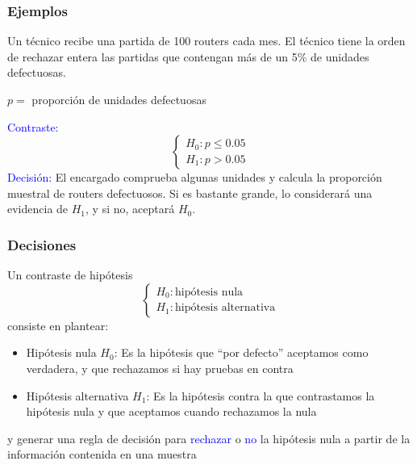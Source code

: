 \documentclass[12pt,t]{beamer}\usepackage[]{graphicx}\usepackage[]{color}
\newcommand{\blue}[1]{\textcolor{blue}{#1}}
\renewcommand{\emph}[1]{{\color{red}#1}}
\renewcommand{\leq}{\leqslant}
\theoremstyle{plain}
\theoremstyle{definition}
\begin{document}
\begin{frame}
\frametitle{Ejemplos}

Un técnico recibe una partida de 100 routers cada mes. El técnico tiene la orden de rechazar entera las partidas que contengan más de un 5\% de unidades defectuosas.

\medskip

$p=$ proporción de unidades defectuosas
\medskip

\blue{Contraste:}
$$
\left\{\begin{array}{ll} 
H_{0}:p\leq 0.05\\ 
H_{1}:p>0.05
\end{array}
\right.
$$
\blue{Decisión:} El encargado comprueba algunas unidades  y calcula la proporción muestral de routers  defectuosos. Si es bastante grande, lo considerará una evidencia de $H_1$, y si no, aceptará  $H_0$.
\end{frame}



\begin{frame}
\frametitle{Decisiones}

Un \emph{contraste    de hipótesis} 
$$
\left\{\begin{array}{ll}
H_{0}:\mbox{hipótesis nula}\\ H_{1}:\mbox{hipótesis alternativa}
\end{array}
\right.
$$
 consiste en plantear:
\begin{itemize}
\item \emph{Hipótesis nula $H_{0}$}: Es la hipótesis que ``por defecto'' aceptamos como verdadera, y que rechazamos si hay pruebas en contra
\medskip

\item \emph{Hipótesis alternativa $H_{1}$}: Es la hipótesis contra la que
contrastamos la hipótesis nula y que aceptamos cuando rechazamos la nula
\end{itemize}
\medskip
y  generar una \emph{regla de decisión} para \blue{rechazar} o \blue{no} la hipótesis nula a partir de la información contenida en una muestra

\end{frame}
\end{document}
